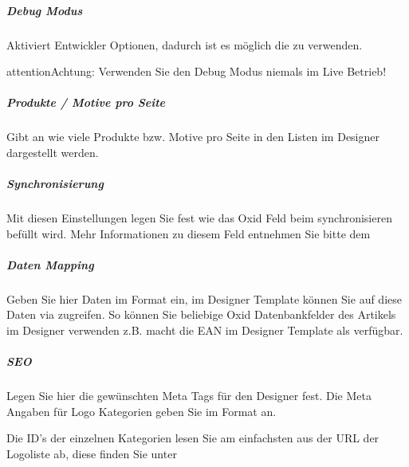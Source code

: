 \documentclass[letterpaper,10pt,ngerman]{sphinxmanual}
\begin{document}
\subparagraph{Debug Modus}
\label{\detokenize{modules/oxid/settings:debug-modus}}
Aktiviert Entwickler Optionen, dadurch ist es möglich die  zu verwenden.

\begin{sphinxadmonition}{attention}{Achtung:}
Verwenden Sie den Debug Modus niemals im Live Betrieb!
\end{sphinxadmonition}


\subparagraph{Produkte / Motive pro Seite}
\label{\detokenize{modules/oxid/settings:produkte-motive-pro-seite}}
Gibt an wie viele Produkte bzw. Motive pro Seite in den Listen im Designer dargestellt werden.


\subparagraph{Synchronisierung}
\label{\detokenize{modules/oxid/settings:synchronisierung}}
Mit diesen Einstellungen legen Sie fest wie das Oxid Feld  beim synchronisieren befüllt wird.
Mehr Informationen zu diesem Feld entnehmen Sie bitte dem 


\subparagraph{Daten Mapping}
\label{\detokenize{modules/oxid/settings:daten-mapping}}
Geben Sie hier Daten im Format  ein, im Designer Template können Sie auf diese Daten via  zugreifen.
So können Sie beliebige Oxid Datenbankfelder des Artikels im Designer verwenden z.B.  macht die EAN im Designer Template
als  verfügbar.


\subparagraph{SEO}
\label{\detokenize{modules/oxid/settings:seo}}
Legen Sie hier die gewünschten Meta Tags für den Designer fest. Die Meta Angaben für Logo Kategorien geben Sie im Format  an.
\def\sphinxLiteralBlockLabel{\label{\detokenize{modules/oxid/settings:id1}}}
\begin{sphinxVerbatim}[commandchars=\\\{\}]
\end{sphinxVerbatim}

Die ID’s der einzelnen Kategorien lesen Sie am einfachsten aus der URL der Logoliste ab, diese finden Sie unter 
\end{document}
